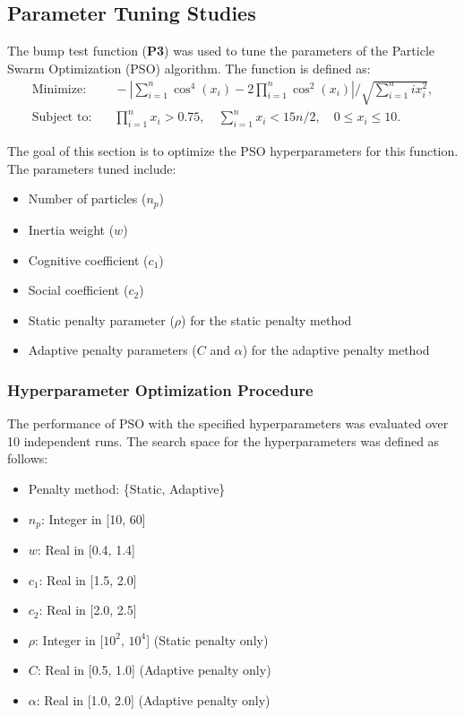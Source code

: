 \documentclass[12pt]{article}
\begin{document}
\subsection{Parameter Tuning Studies}
The bump test function (\textbf{P3}) was used to tune the parameters of the Particle Swarm Optimization (PSO) algorithm. The function is defined as:
\begin{align*}
    \text{Minimize:} & \quad -\left|\sum_{i=1}^{n} \cos^4(x_i) - 2 \prod_{i=1}^{n} \cos^2(x_i) \right| \Big/ \sqrt{\sum_{i=1}^{n} i x_i^2}, \\
    \text{Subject to:} & \quad \prod_{i=1}^{n} x_i > 0.75, \quad \sum_{i=1}^{n} x_i < 15n/2, \quad 0 \leq x_i \leq 10.
\end{align*}

The goal of this section is to optimize the PSO hyperparameters for this function. The parameters tuned include:
\begin{itemize}
    \item Number of particles ($n_p$)
    \item Inertia weight ($w$)
    \item Cognitive coefficient ($c_1$)
    \item Social coefficient ($c_2$)
    \item Static penalty parameter ($\rho$) for the static penalty method
    \item Adaptive penalty parameters ($C$ and $\alpha$) for the adaptive penalty method
\end{itemize}

\subsubsection*{Hyperparameter Optimization Procedure}
The performance of PSO with the specified hyperparameters was evaluated over 10 independent runs. The search space for the hyperparameters was defined as follows:
\begin{itemize}
    \item Penalty method: \{Static, Adaptive\}
    \item $n_p$: Integer in [10, 60]
    \item $w$: Real in [0.4, 1.4]
    \item $c_1$: Real in [1.5, 2.0]
    \item $c_2$: Real in [2.0, 2.5]
    \item $\rho$: Integer in [$10^2$, $10^4$] (Static penalty only)
    \item $C$: Real in [0.5, 1.0] (Adaptive penalty only)
    \item $\alpha$: Real in [1.0, 2.0] (Adaptive penalty only)
\end{itemize}
\end{document}
